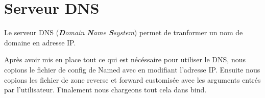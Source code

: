 \section{Serveur DNS}
Le serveur DNS (\textit{\textbf{D}omain \textbf{N}ame \textbf{S}system}) permet de tranformer un nom de domaine en adresse IP.



Après avoir mis en place tout ce qui est nécéssaire pour utiliser le DNS, nous copions le fichier de config de Named avec en modifiant l'adresse IP. Ensuite nous copions les fichier de zone reverse et forward customisée avec les arguments entrés par l'utilisateur. 
Finalement nous chargeons tout cela dans bind.
